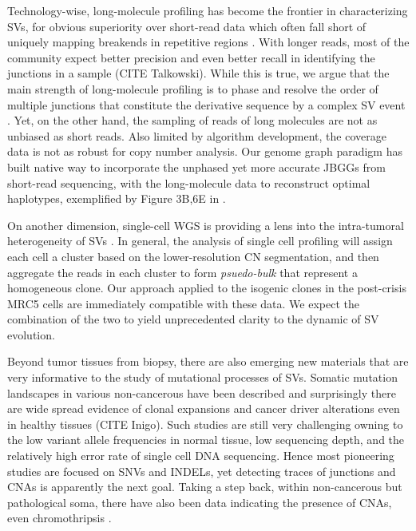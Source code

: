 \documentclass[phd,tocprelim]{cornell}
\begin{document}
Technology-wise, long-molecule profiling has become the frontier in characterizing SVs, for obvious superiority over short-read data which often fall short of uniquely mapping breakends in repetitive regions \cite{Behr2021-gf}. With longer reads, most of the community expect better precision and even better recall in identifying the junctions in a sample (CITE Talkowski). While this is true, we argue that the main strength of long-molecule profiling is to phase and resolve the order of multiple junctions that constitute the derivative sequence by a 
complex SV event \cite{Behr2021-gf,Hadi2020-um}. Yet, on the other hand, the sampling of reads of long molecules are not as unbiased as short reads. Also limited by algorithm development, the coverage data is not as robust for copy number analysis. Our genome graph paradigm has built native way to incorporate the unphased yet more accurate JBGGs from short-read sequencing, with the long-molecule data to reconstruct optimal haplotypes, exemplified by Figure 3B,6E in \cite{Hadi2020-um}.

On another dimension, single-cell WGS is providing a lens into the intra-tumoral heterogeneity of SVs \cite{laks2019,Salehi2021-xi}. In general, the analysis of single cell profiling will assign each cell a cluster based on the lower-resolution CN segmentation, and then aggregate the reads in each cluster to form \textit{psuedo-bulk} that represent a homogeneous clone. Our approach applied to the isogenic clones in the post-crisis MRC5 cells are immediately compatible with these data. We expect the combination of the two to yield unprecedented clarity to the dynamic of SV evolution.

Beyond tumor tissues from biopsy, there are also emerging new materials that are very informative to the study of mutational processes of SVs. Somatic mutation landscapes in various non-cancerous have been described and surprisingly there are wide spread evidence of clonal expansions and cancer driver alterations even in healthy tissues (CITE Inigo). Such studies are still very challenging owning to the low variant allele frequencies in normal tissue, low sequencing depth, and the relatively high error rate of single cell DNA sequencing. Hence most pioneering studies are focused on SNVs and INDELs, yet detecting traces of junctions and CNAs is apparently the next goal. Taking a step back, within non-cancerous but pathological soma, there have also been data indicating the presence of CNAs, even chromothripsis \cite{McDermott2015-xc}.
\end{document}
